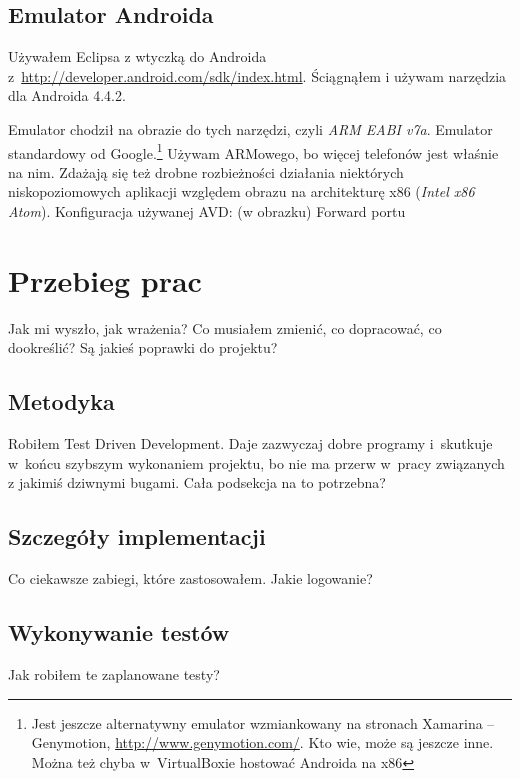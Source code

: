 \subsection{Emulator Androida}
\label{android-emulator}
Używałem Eclipsa z wtyczką do Androida z~\url{http://developer.android.com/sdk/index.html}.
Ściągnąłem i używam narzędzia dla Androida 4.4.2.

Emulator chodził na obrazie do tych narzędzi, czyli \emph{ARM EABI v7a}. Emulator standardowy od Google.\footnote{Jest jeszcze alternatywny emulator wzmiankowany na stronach Xamarina -- Genymotion, \url{http://www.genymotion.com/}. Kto wie, może są jeszcze inne. Można też chyba w~VirtualBoxie hostować Androida na x86}
Używam ARMowego, bo więcej telefonów jest właśnie na nim. Zdażają się też drobne rozbieżności działania niektórych niskopoziomowych aplikacji względem obrazu na architekturę x86 (\emph{Intel x86 Atom}).
Konfiguracja używanej AVD: (w obrazku)
Forward portu



\section{Przebieg prac}
Jak mi wyszło, jak wrażenia? Co musiałem zmienić, co dopracować, co dookreślić? Są jakieś poprawki do projektu?

\subsection{Metodyka}
Robiłem Test Driven Development. Daje zazwyczaj dobre programy i~skutkuje w~końcu szybszym wykonaniem projektu, bo nie ma przerw w~pracy związanych z jakimiś dziwnymi bugami.
Cała podsekcja na to potrzebna?

\subsection{Szczegóły implementacji}
Co ciekawsze zabiegi, które zastosowałem.
Jakie logowanie?

\subsection{Wykonywanie testów}
Jak robiłem te zaplanowane testy?

